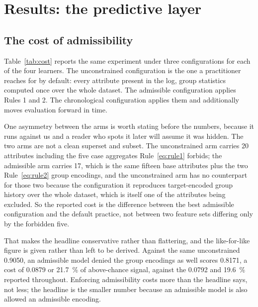 
\section{Results: the predictive layer}
\label{sec:results-predictive}

\subsection{The cost of admissibility}
\label{sec:cost}

Table~\ref{tab:cost} reports the same experiment under three configurations for each of the
four learners. The unconstrained configuration is the one a practitioner reaches for by
default: every attribute present in the log, group statistics computed once over the whole
dataset. The admissible configuration applies Rules 1 and 2. The chronological configuration
applies them and additionally moves evaluation forward in time.

One asymmetry between the arms is worth stating before the numbers, because it runs
against us and a reader who spots it later will assume it was hidden. The two arms are
not a clean superset and subset. The unconstrained arm carries \num{20} attributes
including the five case aggregates Rule~\ref{eq:rule1} forbids; the admissible arm carries \num{17},
which is the same fifteen base attributes plus the two Rule~\ref{eq:rule2} group encodings, and
the unconstrained arm has no counterpart for those two because the configuration it reproduces
target-encoded group history over the whole dataset, which is itself one of the attributes
being excluded. So the reported cost is the difference between the best admissible
configuration and the default practice, not between two feature sets differing only by the
forbidden five.

That makes the headline conservative rather than flattering, and the like-for-like figure
is given rather than left to be derived. Against the same unconstrained \num{0.9050}, an
admissible model denied the group encodings as well scores \num{0.8171}, a cost of \num{0.0879}
or \SI{21.7}{\percent} of above-chance signal, against the \num{0.0792} and \SI{19.6}{\percent} reported
throughout. Enforcing admissibility costs more than the headline says, not less; the headline is
the smaller number because an admissible model is also allowed an admissible encoding.

